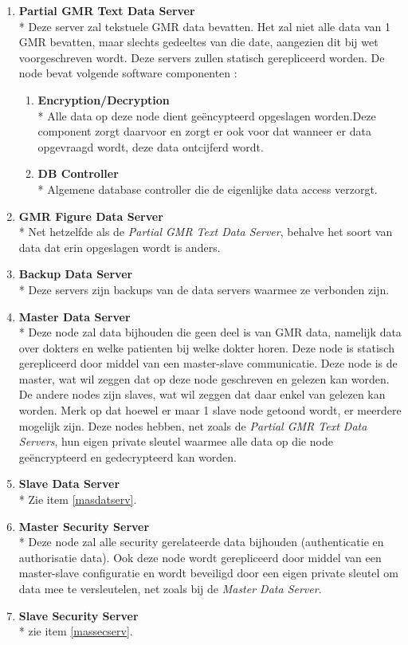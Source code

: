 \documentclass[a4paper,10pt]{article}
\begin{document}
\begin{enumerate}
\item \textbf{Partial GMR Text Data Server}\\*
Deze server zal tekstuele GMR data bevatten. Het zal niet alle data van 1 GMR bevatten, maar slechts gedeeltes van die date, aangezien dit bij wet voorgeschreven wordt. Deze servers zullen statisch gerepliceerd worden. De node bevat volgende software componenten : 
\begin{enumerate}
 \item \textbf{Encryption/Decryption}\\*
Alle data op deze node dient geëncypteerd opgeslagen worden.Deze component zorgt daarvoor en zorgt er ook voor dat wanneer er data opgevraagd wordt, deze data ontcijferd wordt.
\item \textbf{DB Controller}\\*
Algemene database controller die de eigenlijke data access verzorgt.
\end{enumerate}

\item \textbf{GMR Figure Data Server}\\*
Net hetzelfde als de \textit{Partial GMR Text Data Server}, behalve het soort van data dat erin opgeslagen wordt is anders.

\item \textbf{Backup Data Server}\\*
Deze servers zijn backups van de data servers waarmee ze verbonden zijn.

\item \textbf{Master Data Server}\\*
\label{masdatserv}
Deze node zal data bijhouden die geen deel is van GMR data, namelijk data over dokters en welke patienten bij welke dokter horen. Deze node is statisch gerepliceerd door middel van een master-slave communicatie. Deze node is de master, wat wil zeggen dat op deze node geschreven en gelezen kan worden. De andere nodes zijn slaves, wat wil zeggen dat daar enkel van gelezen kan worden. Merk op dat hoewel er maar 1 slave node getoond wordt, er meerdere mogelijk zijn. Deze nodes hebben, net zoals de \textit{Partial GMR Text Data Servers}, hun eigen private sleutel waarmee alle data op die node geëncrypteerd en gedecrypteerd kan worden.
\item \textbf{Slave Data Server}\\*
Zie item \ref{masdatserv}.

\item \textbf{Master Security Server}\\*
\label{massecserv}
Deze node zal alle security gerelateerde data bijhouden (authenticatie en authorisatie data). Ook deze node wordt gerepliceerd door middel van een master-slave configuratie en wordt beveiligd door een eigen private sleutel om data mee te versleutelen, net zoals bij de \textit{Master Data Server}.
\item \textbf{Slave Security Server}\\*
zie item \ref{massecserv}.


\end{enumerate}
\end{document}
